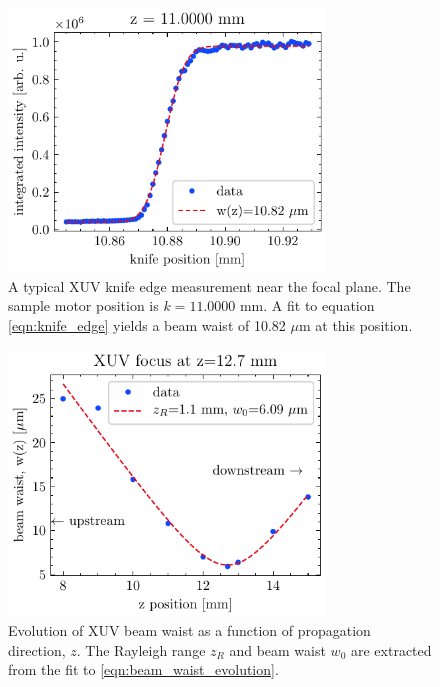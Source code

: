 \begin{figure}
	\centering
	\includegraphics[width=0.75\textwidth]{figures/chap3/XUV_focus_knife_edge.pdf}
	\caption{A typical XUV knife edge measurement near the focal plane. The sample motor position is $k=11.0000$ mm. A fit to equation \cref{eqn:knife_edge} yields a beam waist of 10.82 $\mu$m at this position.}
	\label{fig:XUV_focus_knife_edge}
\end{figure}

\begin{figure}
	\centering
	\includegraphics[width=0.75\textwidth]{figures/chap3/XUV_waist_vs_k.pdf}
	\caption{Evolution of XUV beam waist as a function of propagation direction, $z$. The Rayleigh range $z_R$ and beam waist $w_0$ are extracted from the fit to \cref{eqn:beam_waist_evolution}.}
	\label{fig:XUV_waist_vs_k}
\end{figure}

